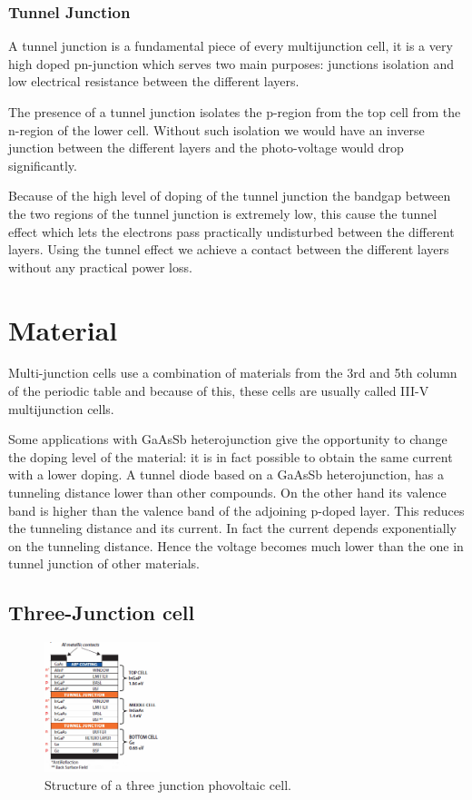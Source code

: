 \documentclass[11pt]{article} %
\begin{document}
\subsubsection{Tunnel Junction}

A tunnel junction is a fundamental piece of every multijunction cell, it is a very high doped pn-junction which serves two main purposes: junctions isolation and low electrical resistance between the different layers.  

The presence of a tunnel junction isolates the p-region from the top cell from the n-region of the lower cell.  Without such isolation we would have an inverse junction between the different layers and the photo-voltage would drop significantly.  

Because of the high level of doping of the tunnel junction the bandgap between the two regions of the tunnel junction is extremely low, this cause the tunnel effect which lets the electrons pass practically undisturbed between the different layers.  Using the tunnel effect we achieve a contact between the different layers without any practical power loss.


\section{Material}

Multi-junction cells use a combination of materials from the 3rd  and 5th column of the periodic table and because of this, these cells are usually called III-V multijunction cells.

Some applications with GaAsSb heterojunction give the opportunity to change the doping level of the material: it is in fact possible to obtain the same current with a lower doping. A tunnel diode based on a GaAsSb heterojunction, has a tunneling distance lower than other compounds. On the other hand its valence band is higher than the valence band of the adjoining p-doped layer. This reduces the tunneling distance and its current. In fact the current depends exponentially on the tunneling distance. Hence the voltage becomes much lower than the one in tunnel junction of other materials.  

\subsection{Three-Junction cell}

\begin{figure}
	\centering
	\includegraphics[width=0.3\textwidth]{img/f2big.png}
	\caption{Structure of a three junction phovoltaic cell.}
\end{figure}
\end{document}

